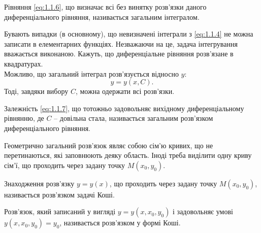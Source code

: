 \begin{definition}
	Рівняння \eqref{eq:1.1.6}, що визначає всі без винятку розв’язки даного диференціального рівняння, називається загальним інтегралом.
\end{definition}

Бувають випадки (в основному), що невизначені інтеграли з \eqref{eq:1.1.4} не можна записати в елементарних функціях. Незважаючи на це, задача інтегрування вважається виконаною. Кажуть, що диференціальне рівняння розв’язане в квадратурах. \\

Можливо, що загальний інтеграл розв’язується відносно $y$: 
\begin{equation}
	\label{eq:1.1.7}
	y = y(x, C).
\end{equation} Тоді, завдяки вибору $C$, можна одержати всі розв’язки. 

\begin{definition}
	Залежність \eqref{eq:1.1.7}, що тотожньо задовольняє вихідному диференціальному рівнянню, де $C$ -- довільна стала, називається загальним розв’язком диференціального рівняння.
\end{definition}

Геометрично загальний розв’язок являє собою сім’ю кривих, що не перетинаються, які заповнюють деяку область. Іноді треба виділити одну криву сім’ї, що проходить через задану точку $M(x_0, y_0)$.

\begin{definition}
	Знаходження розв’язку $y = y(x)$, що проходить через задану точку $M(x_0, y_0)$, називається розв’язком задачі Коші.
\end{definition}

\begin{definition}
	Розв’язок, який записаний у вигляді $y = y(x, x_0, y_0)$ і задовольняє умові $y(x, x_0, y_0) = y_0$, називається розв’язком у формі Коші.
\end{definition}